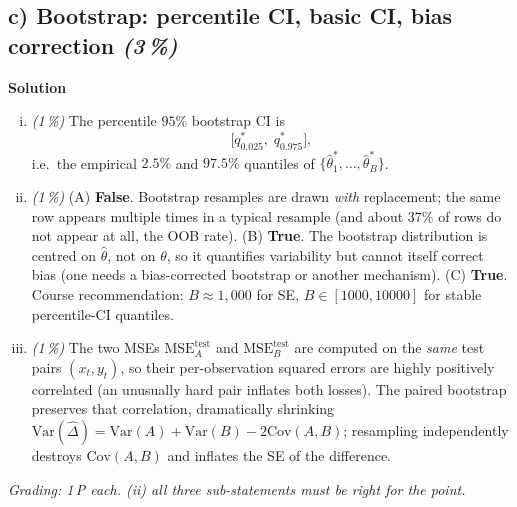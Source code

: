 \documentclass[11pt,a4paper]{article}
\newcommand{\subpoints}[1]{\textit{(#1\,\%)}}
\newcommand{\sol}{\noindent\textbf{Solution}}
\begin{document}
\subsection*{c) Bootstrap: percentile CI, basic CI, bias correction \subpoints{3}}
\sol{}
\begin{enumerate}[(i)]
  \item \subpoints{1} The percentile $95\%$ bootstrap CI is
        $$\boxed{\;\bigl[q_{0.025}^*,\; q_{0.975}^*\bigr],\;}$$
        i.e.\ the empirical $2.5\%$ and $97.5\%$ quantiles of $\{\hat\theta^*_1,\dots,\hat\theta^*_B\}$.
  \item \subpoints{1} (A) \textbf{False}. Bootstrap resamples are drawn \emph{with} replacement; the
        same row appears multiple times in a typical resample (and about $37\%$ of rows do not
        appear at all, the OOB rate). (B) \textbf{True}. The bootstrap distribution is centred on
        $\hat\theta$, not on $\theta$, so it quantifies variability but cannot itself correct bias
        (one needs a bias-corrected bootstrap or another mechanism). (C) \textbf{True}. Course
        recommendation: $B \approx 1{,}000$ for SE, $B \in [1000, 10000]$ for stable percentile-CI
        quantiles.
  \item \subpoints{1} The two MSEs $\mathrm{MSE}_A^{\text{test}}$ and $\mathrm{MSE}_B^{\text{test}}$
        are computed on the \emph{same} test pairs $(x_t, y_t)$, so their per-observation squared
        errors are highly positively correlated (an unusually hard pair inflates both losses). The
        paired bootstrap preserves that correlation, dramatically shrinking
        $\mathrm{Var}(\widehat\Delta) = \mathrm{Var}(A) + \mathrm{Var}(B) - 2\mathrm{Cov}(A,B)$;
        resampling independently destroys $\mathrm{Cov}(A,B)$ and inflates the SE of the
        difference.
\end{enumerate}

\noindent\emph{Grading: 1\,P each. (ii) all three sub-statements must be right for the point.}
\end{document}
